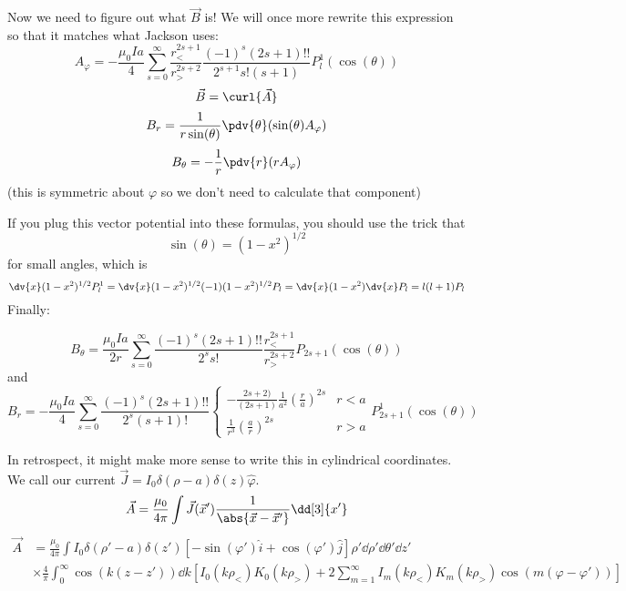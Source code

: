 \documentclass[a4paper,twoside,master.tex]{subfiles}
\begin{document}
Now we need to figure out what $ \vec{B} $ is! We will once more rewrite this expression so that it matches what Jackson uses:
\begin{equation}
    A_{\varphi} = - \frac{\mu_0 I a}{4} \sum_{s=0}^{\infty} \frac{r_<^{2s+1}}{r_>^{2s+2}} \frac{(-1)^s(2s+1)!!}{2^{s+1}s!(s+1)} P_l^1(\cos(\theta))
\end{equation}
\begin{equation}
    \vec{B} = \curl{\vec{A}}
\end{equation}
\begin{equation}
    B_r = \frac{1}{r \sin(\theta)} \pdv{\theta}(\sin(\theta) A_{\varphi})
\end{equation}
\begin{equation}
    B_{\theta} = - \frac{1}{r} \pdv{r}(r A_{\varphi})
\end{equation}
(this is symmetric about $\varphi$ so we don't need to calculate that component)

If you plug this vector potential into these formulas, you should use the trick that
\begin{equation}
    \sin(\theta) = (1-x^2)^{1/2}
\end{equation}
for small angles, which is
\begin{equation}
    \dv{x}(1-x^2)^{1/2} P_l^1 = \dv{x}(1-x^2)^{1/2}(-1)(1-x^2)^{1/2}P_l = \dv{x}(1-x^2) \dv{x}P_l = l(l+1)P_l
\end{equation}
Finally:

\begin{equation}
    B_{\theta} = \frac{\mu_0 I a}{2r} \sum_{s=0}^{\infty}\frac{(-1)^s(2s+1)!!}{2^s s!} \frac{r_<^{2s+1}}{r_>^{2s+2}} P_{2s+1}(\cos(\theta))
\end{equation}
and
\begin{equation}
B_r = - \frac{\mu_0 I a}{4} \sum_{s=0}^{\infty} \frac{(-1)^s(2s+1)!!}{2^s(s+1)!} \begin{cases} - \frac{2s+2)}{(2s+1)} \frac{1}{a^2} \left( \frac{r}{a} \right)^{2s} & r<a \\ \frac{1}{r^3} \left( \frac{a}{r} \right)^{2s} & r>a \end{cases} P_{2s+1}^1(\cos(\theta))
\end{equation}

In retrospect, it might make more sense to write this in cylindrical coordinates. We call our current $ \vec{J} = I_0 \delta(\rho - a) \delta(z) \hat{\varphi}$.
\begin{equation}
    \vec{A} = \frac{\mu_0}{4 \pi} \int \vec{J}( \vec{x} ') \frac{1}{\abs{ \vec{x} - \vec{x}' }} \dd[3]{x'} 
\end{equation}
\begin{align}
    \vec{A} &= \frac{\mu_0}{4 \pi} \int I_0 \delta (\rho' - a) \delta(z')[- \sin(\varphi') \hat{i} + \cos(\varphi') \hat{j} ] \rho' \dd{\rho'} \dd{\theta'} \dd{z'}\nonumber\\
    & \times \frac{4}{\pi} \int_0^{\infty} \cos(k(z-z')) \dd{k} \left[ I_0(k \rho_<) K_0(k \rho_>) + 2 \sum_{m=1}^{\infty} I_m(k \rho_<)K_m(k \rho_>) \cos(m(\varphi - \varphi')) \right]
\end{align}
\end{document}
